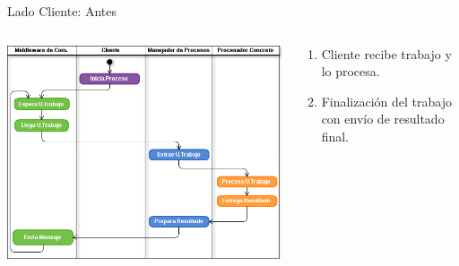 \begin{frame}{Lado Cliente: Antes}
    \begin{columns}[T]
        \begin{column}{.6\textwidth}
            \centering
            \includegraphics[scale=0.3]{images/ActivityFuDClient-Orig.png}
        \end{column}
        \begin{column}{.4\textwidth}
            \begin{enumerate}
                \item   Cliente recibe trabajo y lo procesa.
                \vspace{0.2cm}
                \item   Finalización del trabajo con envío de resultado final.
            \end{enumerate}
        \end{column}
    \end{columns}
\end{frame}

